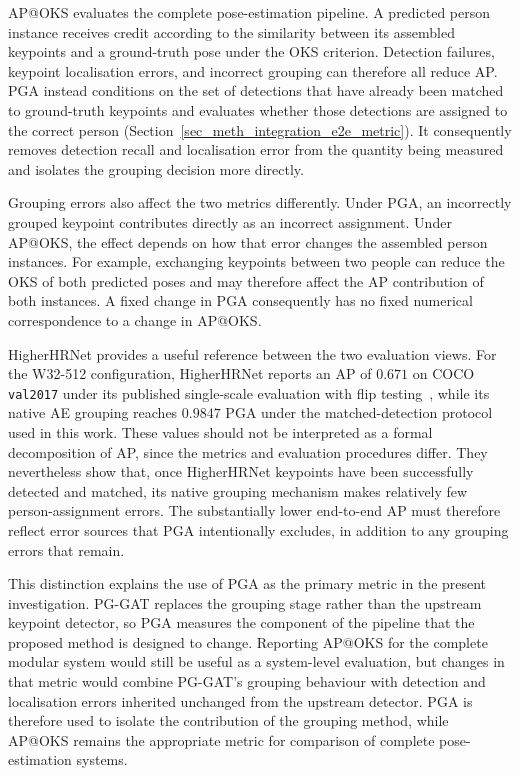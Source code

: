 AP@OKS evaluates the complete pose-estimation pipeline.
A predicted person instance receives credit according to the similarity
between its assembled keypoints and a ground-truth pose under the OKS
criterion.
Detection failures,
keypoint localisation errors,
and incorrect grouping can therefore all reduce AP.
PGA instead conditions on the set of detections that have already been
matched to ground-truth keypoints
and evaluates whether those detections are assigned to the correct
person (Section~\ref{sec_meth_integration_e2e_metric}).
It consequently removes detection recall and localisation error from
the quantity being measured
and isolates the grouping decision more directly.

Grouping errors also affect the two metrics differently.
Under PGA, an incorrectly grouped keypoint contributes directly
as an incorrect assignment.
Under AP@OKS, the effect depends on how that error changes the
assembled person instances.
For example, exchanging keypoints between two people can reduce
the OKS of both predicted poses
and may therefore affect the AP contribution of both instances.
A fixed change in PGA consequently has no fixed numerical correspondence
to a change in AP@OKS.

HigherHRNet provides a useful reference between the two evaluation
views.
For the W32-512 configuration,
HigherHRNet reports an AP of $0.671$ on COCO \texttt{val2017} under its
published single-scale evaluation with flip testing~\cite{cheng2020higherhrnet},
while its native AE grouping reaches $0.9847$ PGA under the
matched-detection protocol used in this work.
These values should not be interpreted as a formal decomposition of AP,
since the metrics and evaluation procedures differ.
They nevertheless show that, once HigherHRNet keypoints have been
successfully detected and matched, its native grouping mechanism makes
relatively few person-assignment errors.
The substantially lower end-to-end AP must therefore reflect error
sources that PGA intentionally excludes,
in addition to any grouping errors that remain.

This distinction explains the use of PGA as the primary metric in the
present investigation.
PG-GAT replaces the grouping stage rather than the upstream keypoint
detector,
so PGA measures the component of the pipeline that the proposed method
is designed to change.
Reporting AP@OKS for the complete modular system would still be useful
as a system-level evaluation,
but changes in that metric would combine PG-GAT's grouping behaviour
with detection and localisation errors inherited unchanged from the
upstream detector.
PGA is therefore used to isolate the contribution of the grouping method,
while AP@OKS remains the appropriate metric for comparison of complete
pose-estimation systems.


